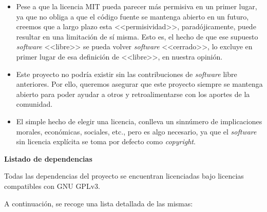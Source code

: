 \vspace{-0.3cm}
\begin{itemize}[\textbullet]
	\item Pese a que la licencia MIT pueda parecer más permisiva en un primer lugar, ya que no obliga a que el código fuente se mantenga abierto en un futuro, creemos que a largo plazo esta <<permisividad>>, paradójicamente, puede resultar en una limitación de sí misma. Esto es, el hecho de que ese supuesto \emph{software} <<libre>> se pueda volver \emph{software} <<cerrado>>, lo excluye en primer lugar de esa definición de <<libre>>, en nuestra opinión.

	\item Este proyecto no podría existir sin las contribuciones de \emph{software} libre anteriores. Por ello, queremos asegurar que este proyecto siempre se mantenga abierto para poder ayudar a otros y retroalimentarse con los aportes de la comunidad.
	
	\item El simple hecho de elegir una licencia, conlleva un sinnúmero de implicaciones morales, económicas, sociales, etc., pero es algo necesario, ya que el \emph{software} sin licencia explícita se toma por defecto como \emph{copyright}.
\end{itemize}

\newpage

\noindent
\textbf{Listado de dependencias}

Todas las dependencias del proyecto se encuentran licenciadas bajo licencias compatibles con GNU GPLv3.

A continuación, se recoge una lista detallada de las mismas:

